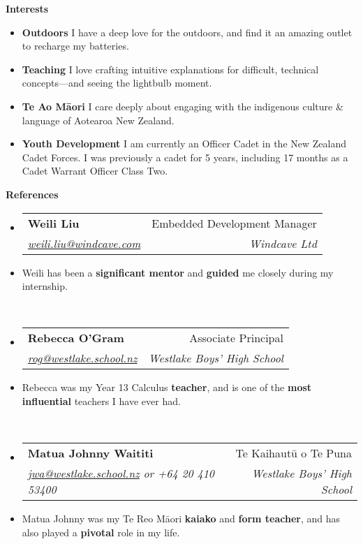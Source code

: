 \documentclass[11pt,a4paper]{article}[leftmargin=*]
\makeatletter
\def \entryspacing {-0pt}
\renewcommand{\section}[2]{\vspace{5pt}
  \colorbox{secondary}{\color{white}\raggedbottom\normalsize\textbf{{#1}{\hspace{2pt}#2\hspace{4pt}}}}
}
\newcommand{\resumeEntryStart}{\begin{itemize}[leftmargin=2.5mm]}
\newcommand{\resumeEntryEnd}{\end{itemize}\vspace{\entryspacing}}
\newcommand{\resumeEntryTSDL}[4]{
  \vspace{-1pt}\item[]
    \begin{tabularx}{0.97\textwidth}{X@{\hspace{60pt}}r}
      \textbf{\color{primary}#1} & {\firabook\color{accent}\small#2} \\
      \textit{\color{accent}\small#3} & \textit{\color{accent}\small#4} \\
    \end{tabularx}\vspace{-6pt}
}
\newcommand{\resumeEntryS}[2]{
  \item[]\small{
    \textbf{\color{primary}#1 }{ #2 \vspace{-4pt}}
  }
}
\newcommand{\resumeEntryP}[1]{
  \item[]\small{
    #1 \vspace{-4pt}
  }\\
}
\newcommand{\resumeBf}[1]{\small\textbf{\color{halfbold}#1}}
\makeatother
\begin{document}

\section{\faUserCircle}{Interests}

\resumeEntryStart
\resumeEntryS
{Outdoors}
{
  I have a deep love for the outdoors, and find it an amazing outlet to recharge my batteries.
}

\resumeEntryS
{Teaching}
{
  I love crafting intuitive explanations for difficult, technical concepts---and seeing the lightbulb moment.
}

\resumeEntryS
{Te Ao Māori}
{
  I care deeply about engaging with the indigenous culture \& language of Aotearoa New Zealand.
}

\resumeEntryS
{Youth Development}
{
  I am currently an Officer Cadet in the New Zealand Cadet Forces. I was previously a cadet for 5 years, including 17 months as a Cadet Warrant Officer Class Two.
}
\resumeEntryEnd


\section{\faUserCheck}{References}

\resumeEntryStart
\resumeEntryTSDL
{Weili Liu}{Embedded Development Manager}
{\href{mailto:weili.liu@windcave.com}{weili.liu@windcave.com}}{Windcave Ltd}

\resumeEntryP{
  Weili has been a \resumeBf{significant mentor} and \resumeBf{guided} me closely during my internship.
}
\resumeEntryEnd

\resumeEntryStart
\resumeEntryTSDL
{Rebecca O'Gram}{Associate Principal}
{\href{mailto:rog@westlake.school.nz}{rog@westlake.school.nz}}{Westlake Boys' High School}

\resumeEntryP{
  Rebecca was my Year 13 Calculus \resumeBf{teacher}, and is one of the \resumeBf{most influential} teachers I have ever had.
}
\resumeEntryEnd

\resumeEntryStart
\resumeEntryTSDL
{Matua Johnny Waititi}{Te Kaihautū o Te Puna}
{\href{mailto:jwa@westlake.school.nz}{jwa@westlake.school.nz} or +64 20 410 53400}{Westlake Boys' High School}

\resumeEntryP{
  Matua Johnny was my Te Reo Māori \resumeBf{kaiako} and \resumeBf{form teacher}, and has also played a \resumeBf{pivotal} role in my life.
}
\resumeEntryEnd
\end{document}

